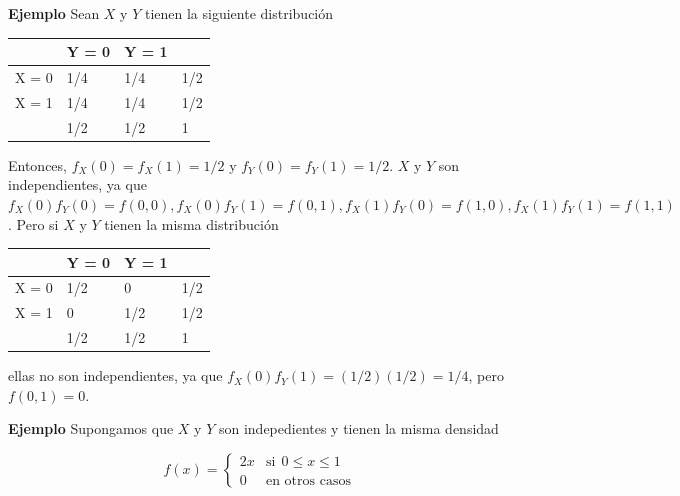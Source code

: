 \documentclass{article}\usepackage[]{graphicx}\usepackage[]{color}
\begin{document}
\vspace{0.5cm}

\textbf{Ejemplo} Sean $X$ y $Y$ tienen la siguiente distribuci\'on

\vspace{0.3cm}

\begin{table}[h]
\centering
\begin{tabular}{l|ll|l}
      & Y = 0 & Y = 1 &     \\
      \hline
X = 0 & 1/4   & 1/4   & 1/2 \\
X = 1 & 1/4   & 1/4   & 1/2 \\
\hline
      & 1/2   & 1/2   &  1  
\end{tabular}
\end{table}

\vspace{0.2cm}

Entonces, $f_{X} (0) = f_{X}(1) = 1/2$ y $f_{Y}(0) = f_{Y}(1) = 1/2$. $X$ y $Y$ son independientes, ya que $f_{X}(0)f_{Y}(0) = f(0,0), f_{X}(0)f_{Y}(1) = f(0,1),  f_{X}(1)f_{Y}(0) = f(1,0), f_{X}(1)f_{Y}(1) = f(1,1)$. Pero si $X$ y $Y$ tienen la misma distribuci\'on

\vspace{0.2cm}

\begin{table}[h]
\centering
\begin{tabular}{l|ll|l}
      & Y = 0 & Y = 1 &     \\
      \hline
X = 0 & 1/2   & 0    & 1/2 \\
X = 1 & 0     & 1/2   & 1/2 \\
\hline
      & 1/2   & 1/2   &  1  
\end{tabular}
\end{table}

\vspace{0.3cm}

ellas no son independientes, ya que $f_{X}(0)f_{Y}(1) = (1/2)(1/2) = 1/4$, pero $f(0,1) = 0$.

\vspace{0.3cm}

\textbf{Ejemplo} Supongamos que $X$ y $Y$ son indepedientes y tienen la misma densidad

\[
f(x) = \begin{cases}
2x & \mbox{si}\  \ 0 \leq x \leq 1\\
0  & \mbox{en otros casos}
\end{cases}
\]
\end{document}
